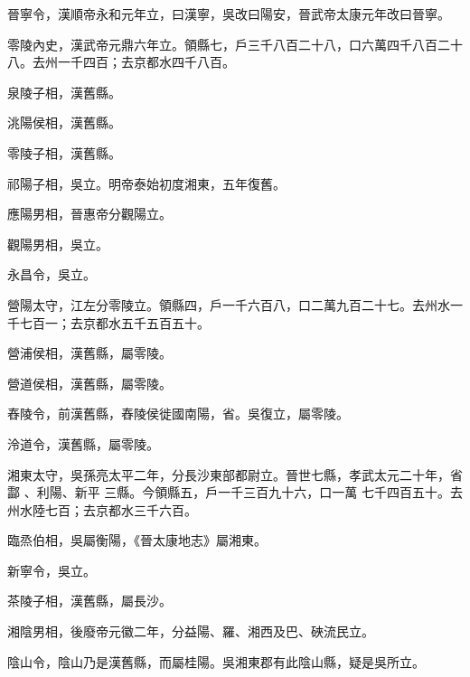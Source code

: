 \begin{pinyinscope}
 晉寧令，漢順帝永和元年立，曰漢寧，吳改曰陽安，晉武帝太康元年改曰晉寧。



 零陵內史，漢武帝元鼎六年立。領縣七，戶三千八百二十八，口六萬四千八百二十八。去州一千四百；去京都水四千八百。



 泉陵子相，漢舊縣。



 洮陽侯相，漢舊縣。



 零陵子相，漢舊縣。



 祁陽子相，吳立。明帝泰始初度湘東，五年復舊。



 應陽男相，晉惠帝分觀陽立。



 觀陽男相，吳立。



 永昌令，吳立。



 營陽太守，江左分零陵立。領縣四，戶一千六百八，口二萬九百二十七。去州水一千七百一；去京都水五千五百五十。



 營浦侯相，漢舊縣，屬零陵。



 營道侯相，漢舊縣，屬零陵。



 舂陵令，前漢舊縣，舂陵侯徙國南陽，省。吳復立，屬零陵。



 泠道令，漢舊縣，屬零陵。


湘東太守，吳孫亮太平二年，分長沙東部都尉立。晉世七縣，孝武太元二十年，省酃
 、利陽、新平
 三縣。今領縣五，戶一千三百九十六，口一萬
 七千四百五十。去州水陸七百；去京都水三千六百。



 臨烝伯相，吳屬衡陽，《晉太康地志》屬湘東。



 新寧令，吳立。



 茶陵子相，漢舊縣，屬長沙。



 湘陰男相，後廢帝元徽二年，分益陽、羅、湘西及巴、硤流民立。



 陰山令，陰山乃是漢舊縣，而屬桂陽。吳湘東郡有此陰山縣，疑是吳所立。




\end{pinyinscope}
